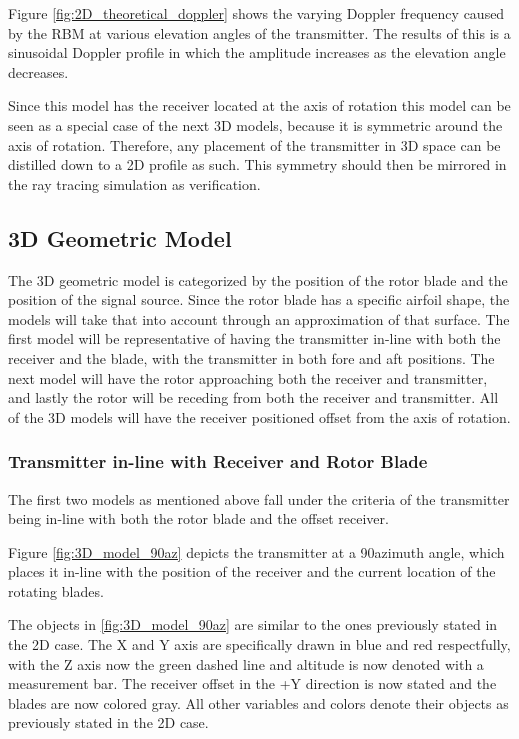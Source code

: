 Figure \ref{fig:2D_theoretical_doppler} shows the varying Doppler frequency caused by the RBM at various elevation angles of the transmitter. The results of this is a sinusoidal Doppler profile in which the amplitude increases as the elevation angle decreases. 

Since this model has the receiver located at the axis of rotation this model can be seen as a special case of the next 3D models, because it is symmetric around the axis of rotation. Therefore, any placement of the transmitter in 3D space can be distilled down to a 2D profile as such. This symmetry should then be mirrored in the ray tracing simulation as verification.

\subsection{3D Geometric Model}
The 3D geometric model is categorized by the position of the rotor blade and the position of the signal source. Since the rotor blade has a specific airfoil shape, the models will take that into account through an approximation of that surface. The first model will be representative of having the transmitter in-line with both the receiver and the blade, with the transmitter in both fore and aft positions. The next model will have the rotor approaching both the receiver and transmitter, and lastly the rotor will be receding from both the receiver and transmitter. All of the 3D models will have the receiver positioned offset from the axis of rotation.

\subsubsection{Transmitter in-line with Receiver and Rotor Blade}
The first two models as mentioned above fall under the criteria of the transmitter being in-line with both the rotor blade and the offset receiver. 

Figure \ref{fig:3D_model_90az} depicts the transmitter at a 90\textdegree \space azimuth angle, which places it in-line with the position of the receiver and the current location of the rotating blades. 

The objects in \ref{fig:3D_model_90az}  are similar to the ones previously stated in the 2D case. The X and Y axis are specifically drawn in blue and red respectfully, with the Z axis now the green dashed line and altitude is now denoted with a measurement bar. The receiver offset in the +Y direction is now stated and the blades are now colored gray. All other variables and colors denote their objects as previously stated in the 2D case. 

